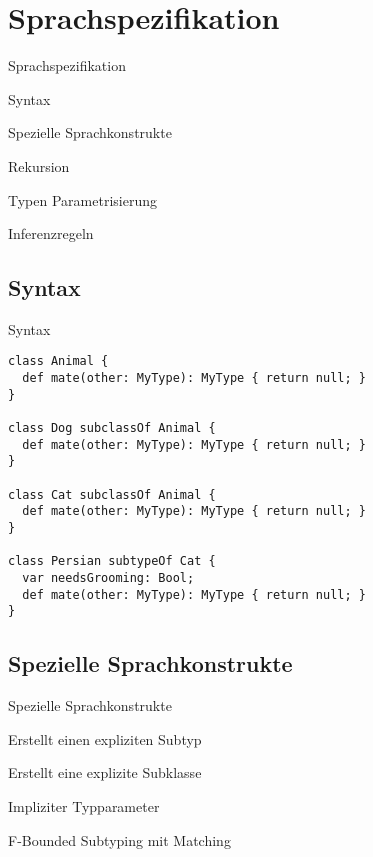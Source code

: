 \section{Sprachspezifikation}
\begin{frame}[t]{Sprachspezifikation}

	\begin{bigitemize}{3mm}
		\item Syntax
		\item Spezielle Sprachkonstrukte
		\item Rekursion
		\item Typen Parametrisierung
		\item Inferenzregeln
	\end{bigitemize}
\end{frame}

\subsection{Syntax}
\begin{frame}[fragile]{Syntax}
\begin{lstlisting}[language=ooplss]
class Animal {
  def mate(other: MyType): MyType { return null; }
}

class Dog subclassOf Animal {
  def mate(other: MyType): MyType { return null; }
}

class Cat subclassOf Animal {
  def mate(other: MyType): MyType { return null; }
}

class Persian subtypeOf Cat {
  var needsGrooming: Bool;
  def mate(other: MyType): MyType { return null; }
}
\end{lstlisting}
\end{frame}

\subsection{Spezielle Sprachkonstrukte}
\begin{frame}{Spezielle Sprachkonstrukte}
	\begin{description}[<+->]
		\item[SubtypeOf] Erstellt einen expliziten Subtyp

		\item[SubclassOf] Erstellt eine explizite Subklasse

		\item[MyType] Impliziter Typparameter

		\item[Typenparametrisierung] F-Bounded Subtyping mit Matching
	\end{description}
\end{frame}


